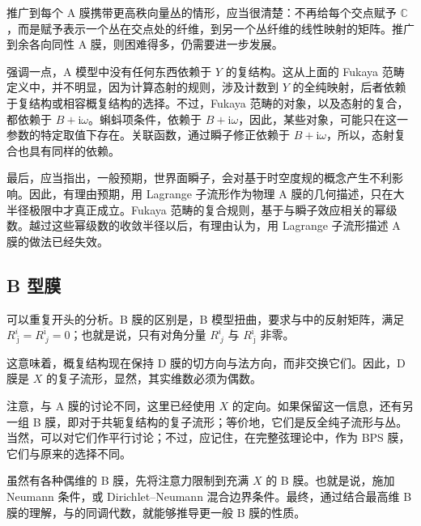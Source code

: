 推广到每个 A 膜携带更高秩向量丛的情形，应当很清楚：不再给每个交点赋予 $\mathbb{C}$，而是赋予表示一个丛在交点处的纤维，到另一个丛纤维的线性映射的矩阵。推广到余各向同性 A 膜，则困难得多，仍需要进一步发展。

强调一点，A 模型中没有任何东西依赖于 $Y$ 的复结构。这从上面的 Fukaya 范畴定义中，并不明显，因为计算态射的规则，涉及计数到 $Y$ 的全纯映射，后者依赖于复结构或相容概复结构的选择。不过，Fukaya 范畴的对象，以及态射的复合，都依赖于 $B+\mathrm{i}\omega$。蝌蚪项条件，依赖于 $B+\mathrm{i}\omega$，因此，某些对象，可能只在这一参数的特定取值下存在。关联函数，通过瞬子修正依赖于 $B+\mathrm{i}\omega$，所以，态射复合也具有同样的依赖。

最后，应当指出，一般预期，世界面瞬子，会对基于时空度规的概念产生不利影响。因此，有理由预期，用 Lagrange 子流形作为物理 A 膜的几何描述，只在大半径极限中才真正成立。Fukaya 范畴的复合规则，基于与瞬子效应相关的幂级数。越过这些幂级数的收敛半径以后，有理由认为，用 Lagrange 子流形描述 A 膜的做法已经失效。

\subsection{B 型膜}\label{sec:3.6.3}

可以重复开头的分析。B 膜的区别是，B 模型扭曲，要求与中的反射矩阵，满足 $R^i_{\ \bar\jmath}=R^{\bar\imath}_{\ j}=0$；也就是说，只有对角分量 $R^i_{\ j}$ 与 $R^{\bar\imath}_{\ \bar\jmath}$ 非零。

这意味着，概复结构现在保持 D 膜的切方向与法方向，而非交换它们。因此，D 膜是 $X$ 的复子流形，显然，其实维数必须为偶数。

注意，与 A 膜的讨论不同，这里已经使用 $X$ 的定向。如果保留这一信息，还有另一组 B 膜，即对于共轭复结构的复子流形；等价地，它们是反全纯子流形与丛。当然，可以对它们作平行讨论；不过，应记住，在完整弦理论中，作为 BPS 膜，它们与原来的选择不同。

虽然有各种偶维的 B 膜，先将注意力限制到充满 $X$ 的 B 膜。也就是说，施加 Neumann 条件，或 Dirichlet--Neumann 混合边界条件。最终，通过结合最高维 B 膜的理解，与的同调代数，就能够推导更一般 B 膜的性质。

